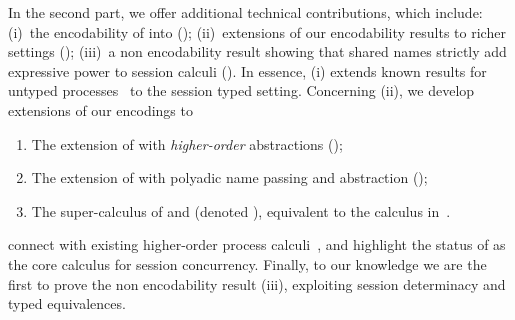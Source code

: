 \documentclass[preprint,11pt]{elsarticle}
\begin{document}
{In the second part, we offer additional technical contributions, which include: 
(i)~the encodability of \HO into \sessp (); 
(ii)~extensions of our encodability results to richer settings ();
(iii)~a non encodability result showing that shared names strictly add expressive power to session calculi ().
In essence, (i) extends known  results for untyped processes~\cite{SangiorgiD:expmpa} to the session typed setting.
Concerning (ii), we develop extensions of our encodings to 
\begin{enumerate}[-]
\item The extension of \HOp with \emph{higher-order} abstractions (\HOpp); 
\item The extension of \HOp with polyadic name passing and abstraction (\PHOp); 
\item The super-calculus of \HOpp and \PHOp (denoted \PHOpp), equivalent to the calculus in~\cite{tlca07}.
\end{enumerate}

connect \HOp with existing higher-order process calculi~\cite{tlca07}, and  
 highlight the status of \HO as the core calculus for session concurrency.
Finally, %
to our knowledge we are the first to prove 
the non encodability result (iii),
exploiting session determinacy and typed equivalences.




}
\end{document}
